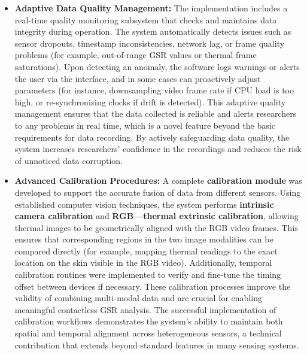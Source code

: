 \documentclass[11pt,a4paper]{report}
\begin{document}
\begin{itemize}
\item \textbf{Adaptive Data Quality Management:} The implementation includes a
  real-time quality monitoring subsystem that checks and maintains data
  integrity during operation. The system automatically detects issues
  such as sensor dropouts, timestamp inconsistencies, network lag, or
  frame quality problems (for example, out-of-range GSR values or
  thermal frame saturations). Upon detecting an anomaly, the software
  logs warnings or alerts the user via the interface, and in some cases
  can proactively adjust parameters (for instance, downsampling video
  frame rate if CPU load is too high, or re-synchronizing clocks if
  drift is detected). This adaptive quality management ensures that the
  data collected is reliable and alerts researchers to any problems in
  real time, which is a novel feature beyond the basic requirements for
  data recording. By actively safeguarding data quality, the system
  increases researchers' confidence in the recordings and reduces the
  risk of unnoticed data corruption.

\item \textbf{Advanced Calibration Procedures:} A complete \textbf{calibration
  module} was developed to support the accurate fusion of data from
  different sensors. Using established computer vision techniques, the
  system performs \textbf{intrinsic camera calibration} and \textbf{RGB---thermal
  extrinsic calibration}, allowing thermal images to be geometrically
  aligned with the RGB video frames. This ensures that corresponding
  regions in the two image modalities can be compared directly (for
  example, mapping thermal readings to the exact location on the skin
  visible in the RGB video). Additionally, temporal calibration routines
  were implemented to verify and fine-tune the timing offset between
  devices if necessary. These calibration processes improve the validity
  of combining multi-modal data and are crucial for enabling meaningful
  contactless GSR analysis. The successful implementation of calibration
  workflows demonstrates the system's ability to maintain both spatial
  and temporal alignment across heterogeneous sensors, a technical
  contribution that extends beyond standard features in many sensing
  systems.


\end{itemize}
\end{document}
